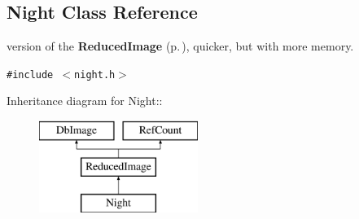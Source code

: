 \subsection{Night  Class Reference}
\label{class_night}
version of the {\bf Reduced\-Image} {\rm (p.\,\pageref{class_reducedimage})}, quicker, but with more memory. 


{\tt \#include $<$night.h$>$}

Inheritance diagram for Night::\begin{figure}[H]
\begin{center}
\leavevmode
\includegraphics[height=3cm]{class_night}
\end{center}
\end{figure}
